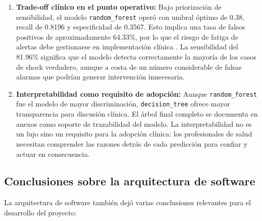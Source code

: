 \begin{enumerate}
    \item \textbf{Trade-off clínico en el punto operativo:} Bajo priorización de sensibilidad, el modelo \texttt{random\_forest} operó con umbral óptimo de 0.38, recall de 0.8196 y especificidad de 0.3567. Esto implica una tasa de falsos positivos de aproximadamente 64.33\%, por lo que el riesgo de fatiga de alertas debe gestionarse en implementación clínica \cite{steyerberg2018}. La sensibilidad del 81.96\% significa que el modelo detecta correctamente la mayoría de los casos de shock verdadero, aunque a costa de un número considerable de falsas alarmas que podrían generar intervención innecesaria.

    \item \textbf{Interpretabilidad como requisito de adopción:} Aunque \texttt{random\_forest} fue el modelo de mayor discriminación, \texttt{decision\_tree} ofrece mayor transparencia para discusión clínica. El árbol final completo se documenta en anexos como soporte de trazabilidad del modelo. La interpretabilidad no es un lujo sino un requisito para la adopción clínica: los profesionales de salud necesitan comprender las razones detrás de cada predicción para confiar y actuar en consecuencia.
\end{enumerate}

\subsection{Conclusiones sobre la arquitectura de software}

La arquitectura de software también dejó varias conclusiones relevantes para el desarrollo del proyecto:


